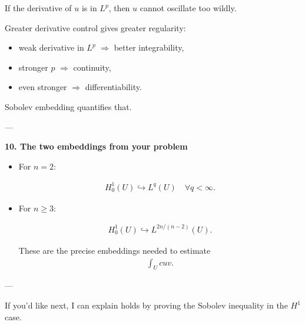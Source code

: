 \documentclass[12pt,a4paper]{report}
\begin{document}
\begin{description}
\begin{description}
If the derivative of $u$ is in $L^p$, then $u$ cannot oscillate too wildly.

Greater derivative control gives greater regularity:

    \begin{itemize}
    \item weak derivative in $L^p$ $\Rightarrow$ better integrability,
    \item stronger $p$ $\Rightarrow$ continuity,
    \item even stronger $\Rightarrow$ differentiability.
    \end{itemize}

Sobolev embedding quantifies that.

---

\item \textbf{10. The two embeddings from your problem}

\begin{itemize}
\item For $n=2$:

\begin{align*}
H_0^1(U)\hookrightarrow L^q(U)\quad \forall q<\infty.
\end{align*}

\item For $n\ge 3$:

\begin{align*}
H_0^1(U)\hookrightarrow L^{2n/(n-2)}(U).
\end{align*}

These are the precise embeddings needed to estimate
\begin{align*}
\int_U c u v.
\end{align*}

\end{itemize}
---
\end{description}

If you'd like next, I can explain  holds by proving the Sobolev inequality in the $H^1$ case.



\end{description} %
\end{document}
